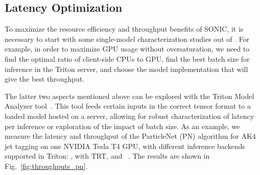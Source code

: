
\subsection{Latency Optimization}
\label{sec:algo_acceleration}


To maximize the resource efficiency and throughput benefits of SONIC, it is necessary to start with some single-model characterization studies out of \CMSSW. For example, in order to maximize GPU usage without oversaturation, we need to find the optimal ratio of client-side CPUs to GPU, find the best batch size for inference in the Triton server, and choose the model implementation that will give the best throughput.

The latter two aspects mentioned above can be explored with the Triton Model Analyzer tool~\cite{triton_model_analyzer}. This tool feeds certain inputs in the correct tensor format to a loaded model hosted on a server, allowing for robust characterization of latency per inference or exploration of the impact of batch size.
As an example, we measure the latency and throughput of the ParticleNet (PN) algorithm for AK4 jet tagging on one NVIDIA Tesla T4 GPU, with different inference backends supported in Triton: \ONNX, \ONNX with TRT, and \PYTORCH~\cite{pytorch}. %
The results are shown in Fig.~\ref{fig:throughputs_pn}. 

